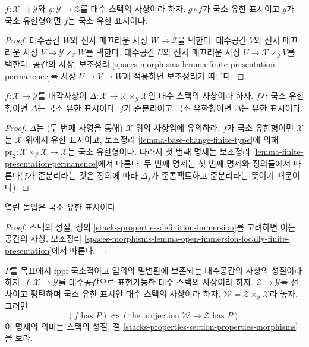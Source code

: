 \begin{lemma}
\label{lemma-finite-presentation-permanence}
$f : \mathcal{X} \to \mathcal{Y}$와 $g : \mathcal{Y} \to \mathcal{Z}$를
대수 스택의 사상이라 하자.%
$g \circ f$가 국소 유한 표시이고 $g$가 국소 유한형이면 $f$는 국소
유한 표시이다.
\end{lemma}

\begin{proof}
대수공간 $W$와 전사 매끄러운 사상 $W \to \mathcal{Z}$을 택한다.
대수공간 $V$와 전사 매끄러운 사상
$V \to \mathcal{Y} \times_\mathcal{Z} W$를 택한다. 대수공간 $U$와
전사 매끄러운 사상 $U \to \mathcal{X} \times_\mathcal{Y} V$를 택한다.
공간의 사상, 보조정리
\ref{spaces-morphisms-lemma-finite-presentation-permanence}를 사상
$U \to V \to W$에 적용하면 보조정리가 따른다.
\end{proof}

\begin{lemma}
\label{lemma-diagonal-morphism-finite-type}
$f : \mathcal{X} \to \mathcal{Y}$를 대각사상이
$\Delta : \mathcal{X} \to \mathcal{X} \times_\mathcal{Y} \mathcal{X}$인
대수 스택의 사상이라 하자. $f$가 국소 유한형이면 $\Delta$는 국소
유한 표시이다. $f$가 준분리이고 국소 유한형이면 $\Delta$는 유한
표시이다.
\end{lemma}

\begin{proof}
$\Delta$는 (두 번째 사영을 통해) $\mathcal{X}$ 위의 사상임에 유의하라.
$f$가 국소 유한형이면 $\mathcal{X}$는 $\mathcal{X}$ 위에서 유한
표시이고, 보조정리 \ref{lemma-base-change-finite-type}에 의해
$\text{pr}_2 : \mathcal{X} \times_\mathcal{Y} \mathcal{X} \to \mathcal{X}$는
국소 유한형이다. 따라서 첫 번째 명제는 보조정리
\ref{lemma-finite-presentation-permanence}에서 따른다. 두 번째 명제는
첫 번째 명제와 정의들에서 따른다($f$가 준분리라는 것은 정의에 따라
$\Delta_f$가 준콤팩트하고 준분리라는 뜻이기 때문이다).
\end{proof}

\begin{lemma}
\label{lemma-open-immersion-locally-finite-presentation}
열린 몰입은 국소 유한 표시이다.
\end{lemma}

\begin{proof}
스택의 성질, 정의 \ref{stacks-properties-definition-immersion}를 고려하면
이는 공간의 사상, 보조정리
\ref{spaces-morphisms-lemma-open-immersion-locally-finite-presentation}에서
따른다.
\end{proof}

\begin{lemma}
\label{lemma-check-property-after-fppf-base-change}
$P$를 목표에서 fppf 국소적이고 임의의 밑변환에 보존되는 대수공간의
사상의 성질이라 하자. $f : \mathcal{X} \to \mathcal{Y}$를 대수공간으로
표현가능한 대수 스택의 사상이라 하자.
$\mathcal{Z} \to \mathcal{Y}$를 전사이고 평탄하며 국소 유한 표시인
대수 스택의 사상이라 하자.
$\mathcal{W} = \mathcal{Z} \times_\mathcal{Y} \mathcal{X}$라 놓자. 그러면
$$
(f\text{ has }P) \Leftrightarrow
(\text{the projection }\mathcal{W} \to \mathcal{Z}\text{ has }P).
$$
이 명제의 의미는 스택의 성질, 절
\ref{stacks-properties-section-properties-morphisms}을 보라.
\end{lemma}

